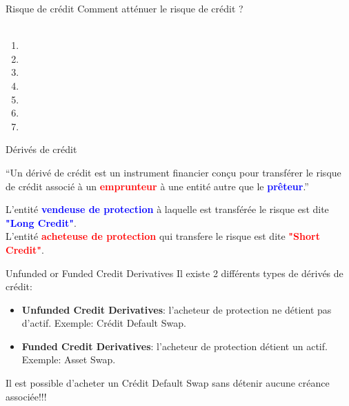\documentclass{beamer}
\begin{document}
\begin{frame}{Risque de crédit}
Comment atténuer le risque de crédit ? \\
\\
\begin{enumerate}
\item {}
\item {}
\item {}
\item {}
\item {}
\item {}
\item {}
\end{enumerate}
\end{frame}

\begin{frame}{Dérivés de crédit}
\begin{exampleblock}{}
  {\large ``Un dérivé de crédit est un instrument financier conçu pour transférer le risque de crédit associé à un \textcolor{red}{\textbf{emprunteur}} à une entité autre que le \textcolor{blue}{\textbf{prêteur}}.''}
\end{exampleblock}
\vspace{0.5cm}
L'entité \textcolor{blue}{\textbf{vendeuse de protection}} à laquelle est transférée le risque est dite \textcolor{blue}{\textbf{"Long Credit"}}.\\
\vspace{0.5cm}
L'entité \textcolor{red}{\textbf{acheteuse de protection}} qui transfere le risque est dite \textcolor{red}{\textbf{"Short Credit"}}.\\
\end{frame}

\begin{frame}{Unfunded or Funded Credit Derivatives}
Il existe 2 différents types de dérivés de crédit:
\vspace{0.5cm}
\begin{itemize}
\item {}\textbf{Unfunded Credit Derivatives}: l'acheteur  de protection ne détient pas d'actif. Exemple: Crédit Default Swap.
\item {}\textbf{Funded Credit Derivatives}: l'acheteur de protection détient un actif. Exemple: Asset Swap.
\end{itemize}
\vspace{0.5cm}
Il est possible d'acheter un Crédit Default Swap sans détenir aucune créance associée!!!
\end{frame}
\end{document}
